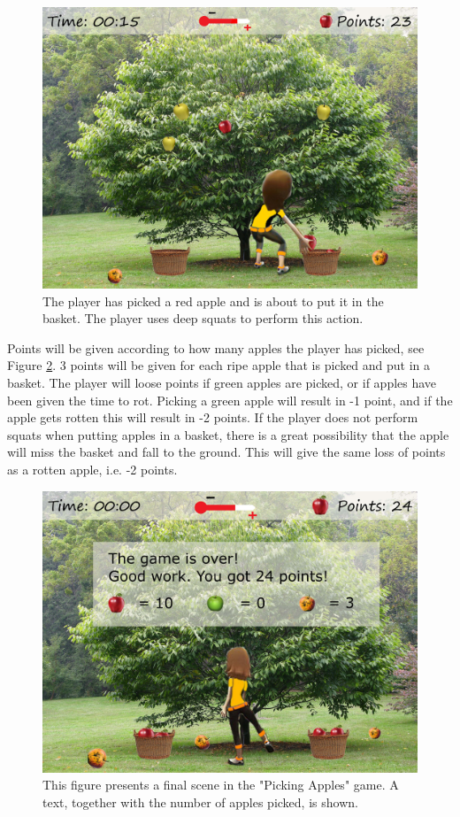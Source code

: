 \begin{figure} [H]
\centering
\includegraphics[scale=0.07]{squatppletreeEng.jpg}
\caption[Picking apples - squats]{The player has picked a red apple and is about to put it in the basket. The player uses deep squats to perform this action.}
\label{fig:appleSquat}
\end{figure}

Points will be given according to how many apples the player has picked, see Figure \ref{fig:appleOver}. 3 points will be given for each ripe apple that is picked and put in a basket. The player will loose points if green apples are picked, or if apples have been given the time to rot. Picking a green apple will result in -1 point, and if the apple gets rotten this will result in -2 points. If the player does not perform squats when putting apples in a basket, there is a great possibility that the apple will miss the basket and fall to the ground. This will give the same loss of points as a rotten apple, i.e. -2 points.       

\begin{figure} [H]
\centering
\includegraphics[scale=0.07]{appletreeendEng.jpg}
\caption[Picking apples - points]{This figure presents a final scene in the "Picking Apples" game. A text, together with the number of apples picked, is shown.}
\label{fig:appleOver}
\end{figure}

